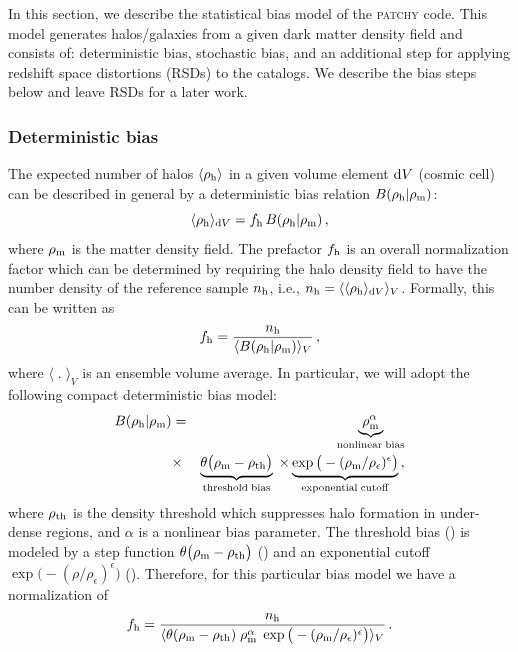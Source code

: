 \documentclass[english,usenatbib]{mn2e}
\newcommand{\be}{\begin{equation}}
\newcommand{\ee}{\end{equation}}
\newcommand{\ba}{\begin{eqnarray}}
\newcommand{\ea}{\end{eqnarray}}
\begin{document}
In this section, we describe the statistical bias model of the \textsc{patchy} code.  This model generates halos/galaxies from a given dark matter density field and consists of: deterministic bias, stochastic bias, and an additional step for applying redshift space distortions (RSDs) to the catalogs. We describe the bias steps below and leave RSDs for a later work. 

\subsubsection{Deterministic bias}

The expected number of halos $\langle \rho_{\rm h} \rangle$ in a given volume element ${\rm d}V$ (cosmic cell) can be described in general by a deterministic bias relation $B(\rho_{\rm h}|\rho_{\rm m})$:
\be
\langle \rho_{\rm h} \rangle_{{\rm d}V} = f_{\rm h}\, B(\rho_{\rm h}|\rho_{\rm m})\,,
\ee
where $\rho_{\rm m}$ is the matter density field. The prefactor $f_{\rm h}$ is an overall normalization factor which can be determined by requiring the halo density field to have the number density of the reference sample $n_{\rm h}$, i.e., $n_{\rm h}=\langle\langle \rho_{\rm h}\rangle_{{\rm d}V}\rangle_{V}$. Formally, this can be written as 
\be
f_{\rm h} = \frac{n_{\rm h}}{\langle B(\rho_{\rm h}|\rho_{\rm m}) \rangle_{V}}\,,
\ee
where  $\langle \;.\; \rangle_{V}$ is an ensemble volume average. 
In particular, we will adopt the following compact deterministic bias model:
\ba
B(\rho_{\rm h}|\rho_{\rm m}) &=&  \underbrace{\rho_{\rm  m}^\alpha}_{\mathrm{nonlinear \; bias}} \nonumber \\ 
&\times& \underbrace{\theta\big(\rho_{\rm m} - \rho_{\rm th}\big)}_{\mathrm{threshold \; bias}} \; \times \underbrace{\exp \big(-(\rho_{\rm m}/\rho_{\epsilon})^{\epsilon}\big)}_{\mathrm{exponential \; cutoff}}\,,
\label{eq:deterministic}
\ea
where $\rho_{\rm th}$ is the density threshold which suppresses halo formation in under-dense regions, and $\alpha$ is a nonlinear bias parameter.
The threshold bias (\citealt{kaiser1984,bardeen1986,sheth2001,mo2002}) is modeled by a step function $\theta \big(\rho_{\rm m} - \rho_{\rm th}\big)$ (\citealt{kitaura2014}) and an exponential cutoff $\exp \big(-(\rho/\rho_{\epsilon})^{\epsilon}\big)$ (\citealt{neyrinck2014}). 
Therefore, for this particular bias model we have a normalization of 
\be
f_{\rm h} = \frac{n_{\rm h}}{\langle \theta(\rho_{\rm m}-\rho_{\rm th})\; \rho_{\rm m}^{\alpha}\; \exp \big(-(\rho_{\rm m}/\rho_{\epsilon})^{\epsilon}\big) \rangle_{V}}\,.
\label{eq:normalization}
\ee
\end{document}
